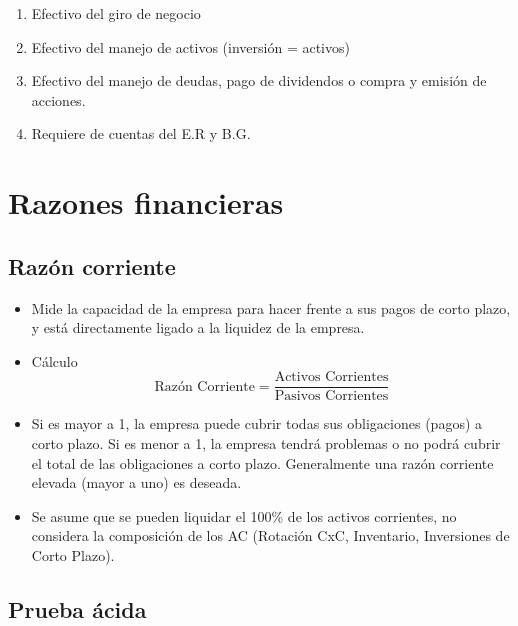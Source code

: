 \begin{cajita}
\begin{itemize}
\begin{itemize}
\begin{enumerate}
                    \item Efectivo del giro de negocio
                    \item Efectivo del manejo de activos (inversión = activos)
                    \item Efectivo del manejo de deudas, pago de dividendos o compra y emisión de acciones.
                    \item Requiere de cuentas del E.R y B.G. 
                \end{enumerate}
            \end{itemize}
        \end{itemize}
    \end{cajita}
    

\section{Razones financieras}

\subsection{Razón corriente}

\begin{itemize}
    \item Mide  la  capacidad  de  la  empresa  para  hacer  frente  a  sus  pagos  de  corto  plazo,  y  está 
    directamente ligado a la liquidez de la empresa. 
    \item Cálculo 
        $$\text{Razón Corriente} =\frac{\text{Activos Corrientes}}{\text{Pasivos Corrientes}} $$
    \item Si es mayor a 1, la empresa puede cubrir todas sus obligaciones (pagos) a corto plazo. Si es 
    menor a 1, la empresa tendrá problemas o no podrá cubrir el total de las obligaciones a corto 
    plazo. Generalmente una razón corriente elevada (mayor a uno) es deseada.
    \item Se  asume  que  se  pueden  liquidar  el  100\%  de  los  activos  corrientes,  no  considera  la 
    composición de los AC (Rotación CxC, Inventario, Inversiones de Corto Plazo).
\end{itemize}


\subsection{Prueba ácida}

